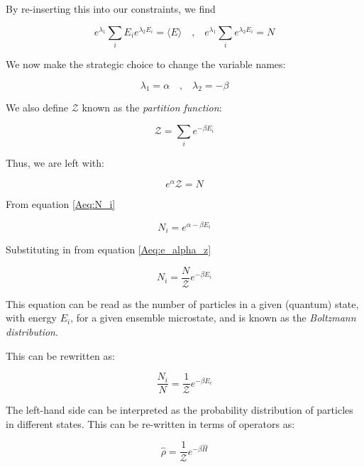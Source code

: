 By re-inserting this into our constraints, we find

\begin{equation}
   e^{\lambda_1} \sum_{i} E_i e^{\lambda_2 E_i} = \langle E \rangle \quad \text{,} \quad    e^{\lambda_1}\sum_{i} e^{\lambda_2 E_i}  = N
\end{equation}

We now make the strategic choice to change the variable names:

\begin{equation}
    \lambda_1 = \alpha \quad \text{,} \quad \lambda_2 = - \beta
\end{equation}

We also define $\mathcal{Z}$ known as the \textit{partition function}:

\begin{equation}
    \mathcal{Z} = \sum_{i} e^{- \beta E_i}
\end{equation}

Thus, we are left with:

\begin{equation}
    \label{Aeq:e_alpha_z}
    e^{\alpha} \mathcal{Z} = N 
\end{equation}

From equation \ref{Aeq:N_i}

\begin{equation}
    N_i = e^{\alpha - \beta E_i}
\end{equation}
 
Substituting in from equation \ref{Aeq:e_alpha_z}

\begin{equation}
    \label{Aeq:N_i_overZ}
    N_i = \frac{N}{\mathcal{Z}} e^{-\beta E_i}
\end{equation}

This equation can be read as the number of particles in a given (quantum) state, with energy $E_i$, for a given ensemble microstate, and is known as the \textit{Boltzmann distribution}.

This can be rewritten as:

\begin{equation}
    \frac{N_i}{N} = \frac{1}{\mathcal{Z}} e^{-\beta E_i}
\end{equation}

The left-hand side can be interpreted as the probability distribution of particles in different states. This can be re-written in terms of operators as:

\begin{equation}
    \label{Aeq:dens_z}
    \hat{\rho} =  \frac{1}{\mathcal{Z}} e^{-\beta \hat{H}}
\end{equation}

